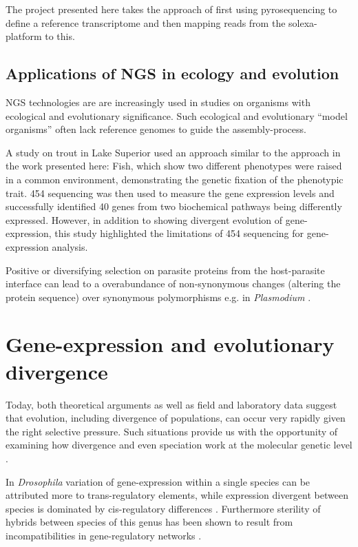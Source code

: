 The project presented here takes the approach of first using
pyrosequencing to define a reference transcriptome and then mapping
reads from the solexa-platform to this.

\subsection{Applications of NGS in ecology and evolution}
\label{sec:appl-ngs}

NGS technologies are are increasingly used in studies on organisms with
ecological and evolutionary significance. Such ecological and
evolutionary ``model organisms'' often lack reference genomes to guide
the assembly-process.

A study on trout in Lake Superior \cite{pmid20331779} used an approach
similar to the approach in the work presented here: Fish, which show
two different phenotypes were raised in a common environment,
demonstrating the genetic fixation of the phenotypic trait. 454
sequencing was then used to measure the gene expression levels and
successfully identified 40 genes from two biochemical pathways being
differently expressed. However, in addition to showing divergent
evolution of gene-expression, this study highlighted the limitations
of 454 sequencing for gene-expression analysis.

Positive or diversifying selection on parasite proteins from the
host-parasite interface can lead to a overabundance of non-synonymous
changes (altering the protein sequence) over synonymous polymorphisms
e.g. in \textit{Plasmodium} \cite{pmid7630387}.


\section{Gene-expression and evolutionary divergence}

Today, both theoretical arguments as well as field and laboratory data
suggest that evolution, including divergence of populations, can occur
very rapidly given the right selective pressure. Such situations
provide us with the opportunity of examining how divergence and even
speciation work at the molecular genetic level
\cite{via_ecological_2002}.

In \textit{Drosophila} variation of gene-expression within a single
species can be attributed more to trans-regulatory elements, while
expression divergent between species is dominated by cis-regulatory
differences \cite{pmid20354124}. Furthermore sterility of hybrids
between species of this genus has been shown to result from
incompatibilities in gene-regulatory networks \cite{pmid16757655}.

